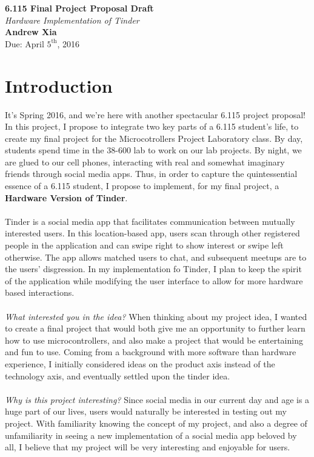 \documentclass[12pt,twoside]{article}
\newcommand{\andrew}{Andrew Xia}
\newcommand{\psetnum}{6.115 Final Project Proposal Draft}
\newcommand{\duedate}{Due: April $5^{\text{th}}$, 2016}
\begin{document}
 
\begin{center} {\bf \large \psetnum}
\\ \emph{Hardware Implementation of Tinder}
\\ {\bf \andrew}
\\ \duedate
\end{center}

\section{Introduction}
It's Spring 2016, and we're here with another spectacular 6.115 project proposal! In this project, I propose to integrate two key parts of a 6.115 student's life, to create my final project for the Microcotrollers Project Laboratory class. By day, students spend time in the 38-600 lab to work on our lab projects. By night, we are glued to our cell phones, interacting with real and somewhat imaginary friends through social media apps. Thus, in order to capture the quintessential essence of a 6.115 student, I propose to implement, for my final project, a {\bf Hardware Version of Tinder}.
\\
\\ Tinder is a social media app that facilitates communication between mutually interested users. In this location-based app, users scan through other registered people in the application and can swipe right to show interest or swipe left otherwise. The app allows matched users to chat, and subsequent meetups are to the users' disgression. In my implementation fo Tinder, I plan to keep the spirit of the application while modifying the user interface to allow for more hardware based interactions. 
\\
\\ \emph{What interested you in the idea?} When thinking about my project idea, I wanted to create a final project that would both give me an opportunity to further learn how to use microcontrollers, and also make a project that would be entertaining and fun to use. Coming from a background with more software than hardware experience, I initially considered ideas on the product axis instead of the technology axis, and eventually settled upon the tinder idea. 
\\ 
\\ \emph{Why is this project interesting?} Since social media in our current day and age is a huge part of our lives, users would naturally be interested in testing out my project. With familiarity knowing the concept of my project, and also a degree of unfamiliarity in seeing a new implementation of a social media app beloved by all, I believe that my project will be very interesting and enjoyable for users. 
\end{document}
